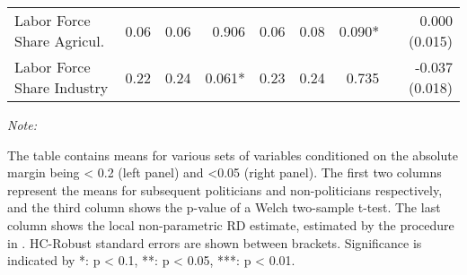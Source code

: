 \begin{table}[!h]
{\begin{threeparttable}
\begin{tabular}[t]{lrrrrrrr}
\hspace{1em}Labor Force Share Agricul. & \num{0.06} & \num{0.06} & 0.906 & \num{0.06} & \num{0.08} & 0.090* & 0.000 (0.015)\\
\hspace{1em}Labor Force Share Industry & \num{0.22} & \num{0.24} & 0.061* & \num{0.23} & \num{0.24} & 0.735 & -0.037 (0.018)\\
\bottomrule
\end{tabular}
\begin{tablenotes}[para]
\item \textit{Note: } 
\item The table contains means for various sets of variables conditioned on the absolute margin being < 0.2 (left panel) and <0.05 (right panel). The first two columns represent the means for subsequent politicians and non-politicians respectively, and the third column shows the p-value of a Welch two-sample t-test. The last column shows the local non-parametric RD estimate, estimated by the procedure in \cite{cattaneo2019practical}. HC-Robust standard errors are shown between brackets. Significance is indicated by *: p < 0.1, **: p < 0.05, ***: p < 0.01.
\end{tablenotes}
\end{threeparttable}}
\end{table}
